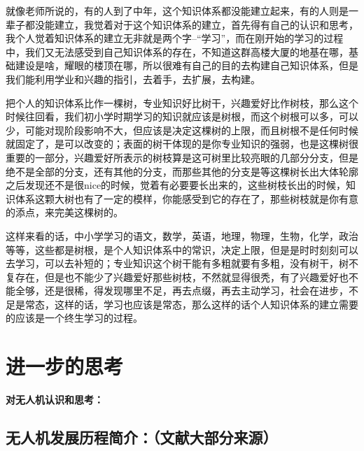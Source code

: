 \documentclass{article}
\begin{document}
就像老师所说的，有的人到了中年，这个知识体系都没能建立起来，有的人则是一辈子都没能建立，我觉着对于这个知识体系的建立，首先得有自己的认识和思考，我个人觉着知识体系的建立无非就是两个字--“学习”，而在刚开始的学习的过程中，我们又无法感受到自己知识体系的存在，不知道这群高楼大厦的地基在哪，基础建设是啥，耀眼的楼顶在哪，所以很难有自己的目的去构建自己知识体系，但是我们能利用学业和兴趣的指引，去着手，去扩展，去构建。\par
把个人的知识体系比作一棵树，专业知识好比树干，兴趣爱好比作树枝，那么这个时候往回看，我们初小学时期学习的知识就应该是树根，而这个树根可以多，可以少，可能对现阶段影响不大，但应该是决定这棵树的上限，而且树根不是任何时候就固定了，是可以改变的；表面的树干体现的是你专业知识的强弱，也是这棵树很重要的一部分，兴趣爱好所表示的树枝算是这可树里比较亮眼的几部分分支，但是绝不是全部的分支，还有其他的分支，而那些其他的分支是等这棵树长出大体轮廓之后发现还不是很nice的时候，觉着有必要要长出来的，这些树枝长出的时候，知识体系这颗大树也有了一定的模样，你能感受到它的存在了，那些树枝就是你有意的添点，来完美这棵树的。\par
这样来看的话，中小学学习的语文，数学，英语，地理，物理，生物，化学，政治等等，这些都是树根，是个人知识体系中的常识，决定上限，但是是时时刻刻可以去学习，可以去补短的；专业知识这个树干能有多粗就要有多粗，没有树干，树不复存在，但是也不能少了兴趣爱好那些树枝，不然就显得很秃，有了兴趣爱好也不能全够，还是很稀，得发现哪里不足，再去点缀，再去主动学习，社会在进步，不足是常态，这样的话，学习也应该是常态，那么这样的话个人知识体系的建立需要的应该是一个终生学习的过程。\par


\section{进一步的思考}


\textbf{对无人机认识和思考：}\par

\subsection{无人机发展历程简介：（文献大部分来源\citep{1}）}
\end{document}
